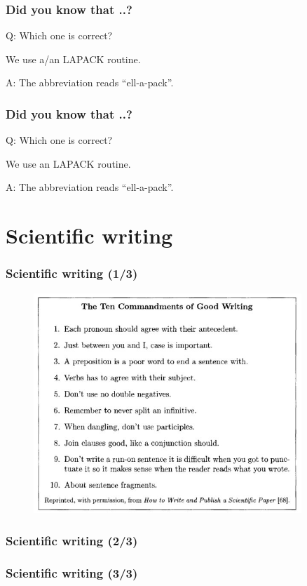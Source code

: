 \documentclass{beamer}
\begin{document}
\begin{frame}
\frametitle{Did you know that ..?}
Q: Which one is correct?
\\
\begin{center}
 We use {\color{red}a/an} LAPACK routine.
\end{center}
{\color{white}A: The abbreviation reads ``ell-a-pack''.}
\end{frame}

\begin{frame}[noframenumbering]
\frametitle{Did you know that ..?}
Q: Which one is correct?
\\
\begin{center}
 We use {\color{red}an} LAPACK routine.
\end{center}
A: The abbreviation reads ``ell-a-pack''.
\end{frame}

\begin{frame}
 \tableofcontents
\end{frame}

\section{Scientific writing}
\begin{frame}
\frametitle{Scientific writing (1/3)}
\begin{figure}[t]
 \includegraphics[width=0.9\textwidth]{images/ten.jpeg}
\end{figure}
\end{frame}
\begin{frame}
\frametitle{Scientific writing (2/3)}
\end{frame}
\begin{frame}
\frametitle{Scientific writing (3/3)}
\end{frame}
\end{document}
